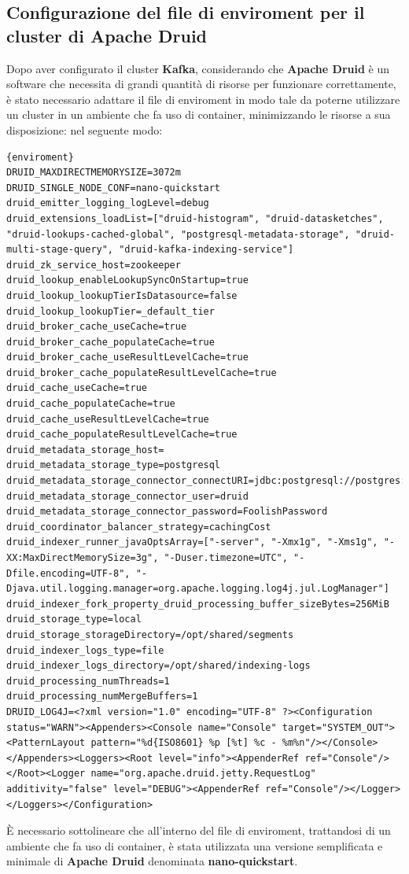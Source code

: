 \subsection{Configurazione del file di enviroment per il cluster di Apache Druid}
Dopo aver configurato il \gls{cluster}{} \textbf{Kafka}, considerando che \textbf{Apache Druid} è un software che necessita di grandi quantità di risorse per funzionare correttamente, è 
stato necessario adattare il file di \gls{enviroment}{} in modo tale da poterne utilizzare un \gls{cluster}{} in un ambiente che fa uso di \gls{container}{}, minimizzando le risorse a sua disposizione: nel seguente modo:
\begin{lstlisting}[caption=\texttt{enviroment}, label=lst:file]{enviroment}
DRUID_MAXDIRECTMEMORYSIZE=3072m
DRUID_SINGLE_NODE_CONF=nano-quickstart
druid_emitter_logging_logLevel=debug
druid_extensions_loadList=["druid-histogram", "druid-datasketches", "druid-lookups-cached-global", "postgresql-metadata-storage", "druid-multi-stage-query", "druid-kafka-indexing-service"]
druid_zk_service_host=zookeeper
druid_lookup_enableLookupSyncOnStartup=true
druid_lookup_lookupTierIsDatasource=false
druid_lookup_lookupTier=_default_tier
druid_broker_cache_useCache=true
druid_broker_cache_populateCache=true
druid_broker_cache_useResultLevelCache=true
druid_broker_cache_populateResultLevelCache=true
druid_cache_useCache=true
druid_cache_populateCache=true
druid_cache_useResultLevelCache=true
druid_cache_populateResultLevelCache=true
druid_metadata_storage_host=
druid_metadata_storage_type=postgresql
druid_metadata_storage_connector_connectURI=jdbc:postgresql://postgres:5432/druid
druid_metadata_storage_connector_user=druid
druid_metadata_storage_connector_password=FoolishPassword
druid_coordinator_balancer_strategy=cachingCost
druid_indexer_runner_javaOptsArray=["-server", "-Xmx1g", "-Xms1g", "-XX:MaxDirectMemorySize=3g", "-Duser.timezone=UTC", "-Dfile.encoding=UTF-8", "-Djava.util.logging.manager=org.apache.logging.log4j.jul.LogManager"]
druid_indexer_fork_property_druid_processing_buffer_sizeBytes=256MiB
druid_storage_type=local
druid_storage_storageDirectory=/opt/shared/segments
druid_indexer_logs_type=file
druid_indexer_logs_directory=/opt/shared/indexing-logs
druid_processing_numThreads=1
druid_processing_numMergeBuffers=1
DRUID_LOG4J=<?xml version="1.0" encoding="UTF-8" ?><Configuration status="WARN"><Appenders><Console name="Console" target="SYSTEM_OUT"><PatternLayout pattern="%d{ISO8601} %p [%t] %c - %m%n"/></Console></Appenders><Loggers><Root level="info"><AppenderRef ref="Console"/></Root><Logger name="org.apache.druid.jetty.RequestLog" additivity="false" level="DEBUG"><AppenderRef ref="Console"/></Logger></Loggers></Configuration>
\end{lstlisting}
È necessario sottolineare che all'interno del file di \gls{enviroment}{}, trattandosi di un ambiente che fa uso di \gls{container}{}, 
è stata utilizzata una versione semplificata e minimale di \textbf{Apache Druid} denominata \textbf{nano-quickstart}.
